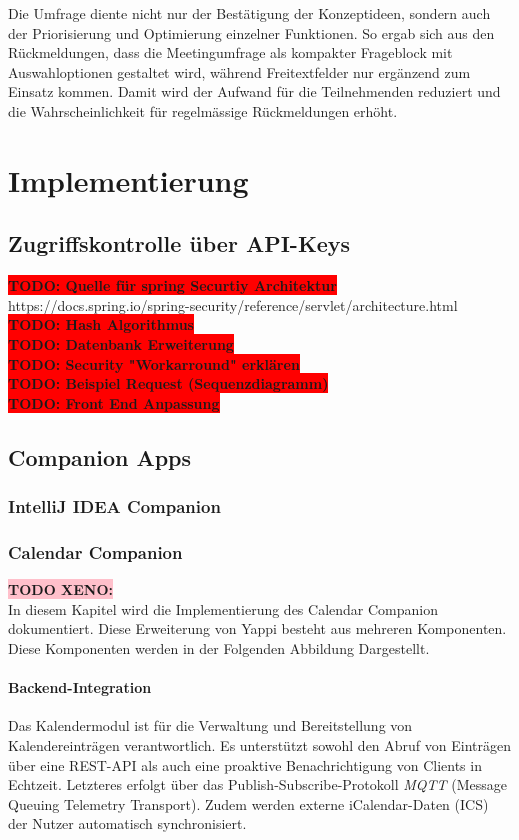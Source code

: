 \documentclass[12pt,a4paper]{report}
\newcommand{\todo}[1]{\colorbox{red}{\textbf{TODO: #1}}\\}
\newcommand{\xeno}[1]{\colorbox{pink}{\textbf{TODO XENO: #1}}\\}
\begin{document}
Die Umfrage diente nicht nur der Bestätigung der Konzeptideen, sondern auch der Priorisierung und Optimierung einzelner Funktionen.
So ergab sich aus den Rückmeldungen, dass die Meetingumfrage als kompakter Frageblock mit Auswahloptionen gestaltet wird,
während Freitextfelder nur ergänzend zum Einsatz kommen.
Damit wird der Aufwand für die Teilnehmenden reduziert und die Wahrscheinlichkeit für regelmässige Rückmeldungen erhöht.

\chapter{Implementierung}
\section{Zugriffskontrolle über API-Keys}

\todo{Quelle für spring Securtiy Architektur}
https://docs.spring.io/spring-security/reference/servlet/architecture.html
\todo{Hash Algorithmus}
\todo{Datenbank Erweiterung}
\todo{Security "Workarround" erklären}
\todo{Beispiel Request (Sequenzdiagramm)}
\todo{Front End Anpassung}

\section{Companion Apps}
\subsection{IntelliJ IDEA Companion}


\subsection{Calendar Companion}
\xeno{}

In diesem Kapitel wird die Implementierung des Calendar Companion dokumentiert.
Diese Erweiterung von Yappi besteht aus mehreren Komponenten. Diese Komponenten werden in der Folgenden Abbildung Dargestellt.

\subsubsection{Backend-Integration}

Das Kalendermodul ist für die Verwaltung und Bereitstellung von Kalendereinträgen verantwortlich.
Es unterstützt sowohl den Abruf von Einträgen über eine REST-API als auch eine proaktive Benachrichtigung von Clients in Echtzeit.
Letzteres erfolgt über das Publish-Subscribe-Protokoll \textit{MQTT} (Message Queuing Telemetry Transport).
Zudem werden externe iCalendar-Daten (ICS) der Nutzer automatisch synchronisiert.
\end{document}
